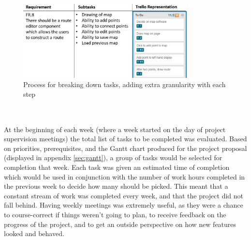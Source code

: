 \begin{figure}[!ht]
	\vspace{2mm}
	\begin{center}
		\includegraphics[width=0.8\textwidth]{images/implementation/task_breakdown.png}
	\end{center}
	\vspace{-6mm}
	\caption{Process for breaking down tasks, adding extra granularity with each step}
	\vspace{-10mm}	
\end{figure}
\ \\
\ \\
At the beginning of each week (where a week started on the day of project supervision meetings) the total list of tasks to be completed was evaluated. Based on priorities, prerequisites, and the Gantt chart produced for the project proposal (displayed in appendix \ref{sec:gantt}), a group of tasks would be selected for completion that week. Each task was given an estimated time of completion which would be used in conjunction with the number of work hours completed in the previous week to decide how many should be picked. This meant that a constant stream of work was completed every week, and that the project did not fall behind. Having weekly meetings was extremely useful, as they were a chance to course-correct if things weren't going to plan, to receive feedback on the progress of the project, and to get an outside perspective on how new features looked and behaved.

\newpage 
